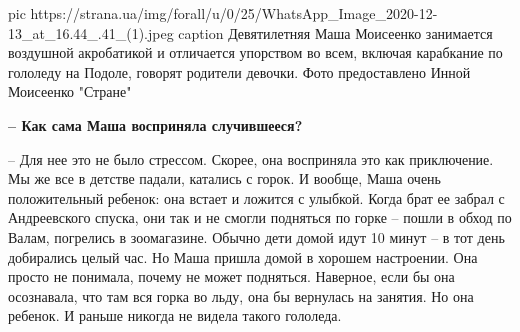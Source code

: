 \ifcmt
pic https://strana.ua/img/forall/u/0/25/WhatsApp_Image_2020-12-13_at_16.44_.41_(1).jpeg
caption Девятилетняя Маша Моисеенко занимается воздушной акробатикой и отличается упорством во всем, включая карабкание по гололеду на Подоле, говорят родители девочки. Фото предоставлено Инной Моисеенко "Стране"
\fi

\textbf{– Как сама Маша восприняла случившееся?}
 
– Для нее это не было стрессом. Скорее, она восприняла это как приключение. Мы
же все в детстве падали, катались с горок. И вообще, Маша очень положительный
ребенок: она встает и ложится с улыбкой. Когда брат ее забрал с Андреевского
спуска, они так и не смогли подняться по горке – пошли в обход по Валам,
погрелись в зоомагазине. Обычно дети домой идут 10 минут – в тот день
добирались целый час. Но Маша пришла домой в хорошем настроении. Она просто не
понимала, почему не может подняться. Наверное, если бы она осознавала, что там
вся горка во льду, она бы вернулась на занятия. Но она ребенок. И раньше
никогда не видела такого гололеда.
